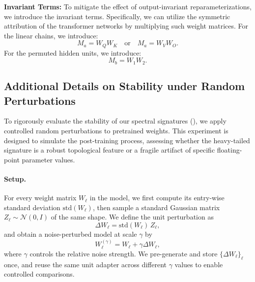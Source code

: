 \textbf{Invariant Terms:} To mitigate the effect of output-invariant reparameterizations, we introduce the invariant terms. Specifically, we can utilize the symmetric attribution of the transformer networks by multiplying such weight matrices. For the linear chains, we introduce:
    \[
    M_a = W_QW_K \quad \text{or} \quad M_a=W_VW_O.
    \]
    For the permuted hidden units, we introduce:
    \[
    M_b=W_1W_2.
    \]




\subsection{Additional Details on Stability under Random Perturbations}\label{app:noise}

To rigorously evaluate the stability of our spectral signatures (\ALPHAHILL), we apply controlled random perturbations to pretrained weights. This experiment is designed to simulate the post-training process, assessing whether the heavy-tailed signature is a robust topological feature or a fragile artifact of specific floating-point parameter values.
\paragraph{Setup.}
For every weight matrix $W_\ell$ in the model, we first compute its entry-wise standard deviation $\mathrm{std}(W_\ell)$, then sample a standard Gaussian matrix $Z_\ell \sim \mathcal{N}(0, I)$ of the same shape.
We define the unit perturbation as
\begin{equation}
\Delta W_\ell = \mathrm{std}(W_\ell)\, Z_\ell,
\end{equation}
and obtain a noise-perturbed model at scale $\gamma$ by
\begin{equation}
W_\ell^{(\gamma)} = W_\ell + \gamma \Delta W_\ell,
\end{equation}
where $\gamma$ controls the relative noise strength.
We pre-generate and store $\{\Delta W_\ell\}_\ell$ once, and reuse the same unit adapter across different $\gamma$ values to enable controlled comparisons.

